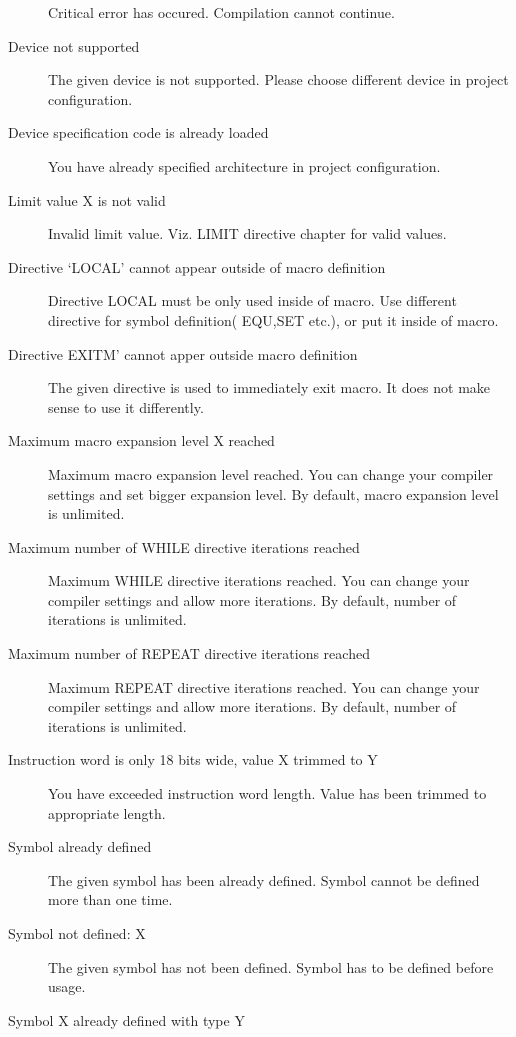 \begin{description}
                Critical error has occured. Compilation cannot continue.
            \item[Device not supported]
                The given device is not supported. Please choose different device in project configuration.
            \item[Device specification code is already loaded ]
                You have already specified architecture in project configuration.
            \item[Limit value X is not valid]
                Invalid limit value. Viz. LIMIT directive chapter for valid values.
            \item[Directive `LOCAL' cannot appear outside of macro definition ]
                Directive LOCAL must be only used inside of macro. Use different directive for symbol definition( EQU,SET etc.), or put it inside of macro.
            \item[Directive EXITM' cannot apper outside macro definition]
                The given directive is used to immediately exit macro. It does not make sense to use it differently.
            \item[Maximum macro expansion level X reached  ]
                Maximum macro expansion level reached. You can change your compiler settings and set bigger expansion level. By default, macro expansion level is unlimited.
            \item[Maximum number of WHILE directive iterations reached ]
                Maximum WHILE directive iterations reached. You can change your compiler settings and allow more iterations. By default, number of iterations is unlimited.
            \item[Maximum number of REPEAT directive iterations reached ]
                Maximum REPEAT directive iterations reached. You can change your compiler settings and allow more iterations. By default, number of iterations is unlimited.
            \item[Instruction word is only 18 bits wide, value X trimmed to Y ]
                You have exceeded instruction word length. Value has been trimmed to  appropriate length.
            \item[Symbol already defined]
                The given symbol has been already defined. Symbol cannot be defined more than one time.
            \item[Symbol not defined: X ]
                The given symbol has not been defined. Symbol has to be defined before usage.
            \item[Symbol X already defined with type Y]

\end{description}
